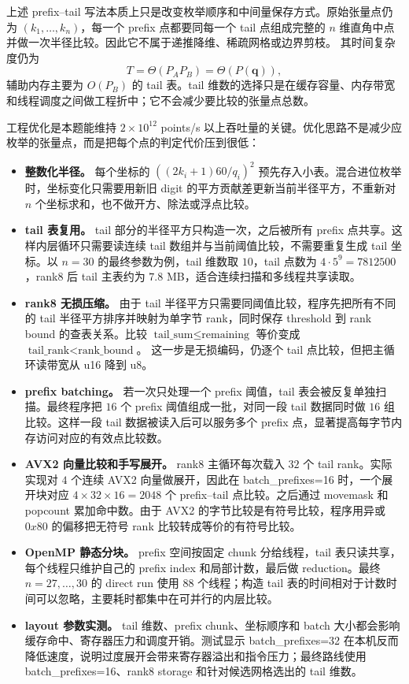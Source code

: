 \documentclass[12pt,a4paper,fontset=none]{ctexart}
\renewcommand{\texttt}[1]{{\ttfamily\footnotesize #1}}
\renewcommand{\texttt}[1]{{\ttfamily #1}}%
\begin{document}
上述 prefix--tail 写法本质上只是改变枚举顺序和中间量保存方式。原始张量点仍为
\((k_1,\ldots,k_n)\)，每一个 prefix 点都要同每一个 tail 点组成完整的
\(n\) 维直角中点并做一次半径比较。因此它不属于递推降维、稀疏网格或边界剪枝。
其时间复杂度仍为
\[
T=\Theta(P_A P_B)=\Theta(P(\mathbf q)),
\]
辅助内存主要为 \(O(P_B)\) 的 tail 表。tail 维数的选择只是在缓存容量、内存带宽和线程调度之间做工程折中；它不会减少要比较的张量点总数。

工程优化是本题能维持 \(2\times10^{12}\) points/s 以上吞吐量的关键。优化思路不是减少应枚举的张量点，而是把每个点的判定代价压到很低：

\begin{itemize}
\item \textbf{整数化半径。} 每个坐标的
\(\left((2k_i+1)60/q_i\right)^2\) 预先存入小表。混合进位枚举时，坐标变化只需要用新旧 digit 的平方贡献差更新当前半径平方，不重新对 \(n\) 个坐标求和，也不做开方、除法或浮点比较。
\item \textbf{tail 表复用。} tail 部分的半径平方只构造一次，之后被所有 prefix 点共享。这样内层循环只需要读连续 tail 数组并与当前阈值比较，不需要重复生成 tail 坐标。以 \(n=30\) 的最终参数为例，tail 维数取 \(10\)，tail 点数为 \(4\cdot5^9=7812500\)，rank8 后 tail 主表约为 \(7.8\) MB，适合连续扫描和多线程共享读取。
\item \textbf{rank8 无损压缩。} 由于 tail 半径平方只需要同阈值比较，程序先把所有不同的 tail 半径平方排序并映射为单字节 rank，同时保存 threshold 到 rank bound 的查表关系。比较
\(\text{tail\_sum}\le \text{remaining}\)
等价变成
\(\text{tail\_rank}<\text{rank\_bound}\)。
这一步是无损编码，仍逐个 tail 点比较，但把主循环读带宽从 u16 降到 u8。
\item \textbf{prefix batching。} 若一次只处理一个 prefix 阈值，tail 表会被反复单独扫描。最终程序把 \(16\) 个 prefix 阈值组成一批，对同一段 tail 数据同时做 \(16\) 组比较。这样一段 tail 数据被读入后可以服务多个 prefix 点，显著提高每字节内存访问对应的有效点比较数。
\item \textbf{AVX2 向量比较和手写展开。} rank8 主循环每次载入 \(32\) 个 tail rank。实际实现对 \(4\) 个连续 AVX2 向量做展开，因此在 \texttt{batch\_prefixes}=16 时，一个展开块对应 \(4\times32\times16=2048\) 个 prefix--tail 点比较。之后通过 movemask 和 popcount 累加命中数。由于 AVX2 的字节比较是有符号比较，程序用异或 \(0x80\) 的偏移把无符号 rank 比较转成等价的有符号比较。
\item \textbf{OpenMP 静态分块。} prefix 空间按固定 chunk 分给线程，tail 表只读共享，每个线程只维护自己的 prefix index 和局部计数，最后做 reduction。最终 \(n=27,\ldots,30\) 的 direct run 使用 \(88\) 个线程；构造 tail 表的时间相对于计数时间可以忽略，主要耗时都集中在可并行的内层比较。
\item \textbf{layout 参数实测。} tail 维数、prefix chunk、坐标顺序和 batch 大小都会影响缓存命中、寄存器压力和调度开销。测试显示 \texttt{batch\_prefixes}=32 在本机反而降低速度，说明过度展开会带来寄存器溢出和指令压力；最终路线使用 \texttt{batch\_prefixes}=16、rank8 storage 和针对候选网格选出的 tail 维数。
\end{itemize}
\end{document}

